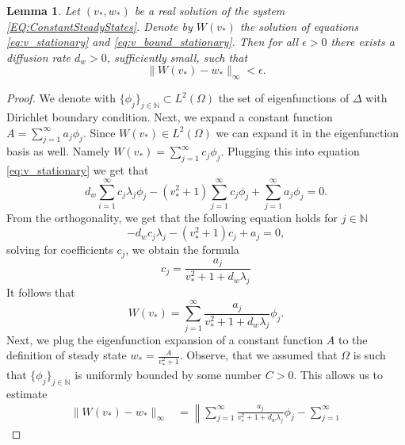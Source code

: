 \documentclass[11pt, a4paper]{article}
\theoremstyle{break}
\theoremstyle{break}
\theoremstyle{break}
\theoremstyle{break}
\theoremstyle{break}
\newtheorem{lem}{Lemma}[section]
\theoremstyle{break}
\theoremstyle{break}
\theoremstyle{break}
\theoremstyle{break}
\begin{document}
\begin{lem}
    \label{lem:stationary_v_estimate_v_star}
    Let $(v_*, w_*)$ be a real solution of the system \eqref{EQ:ConstantSteadyStates}. Denote by $W(v_*)$ the solution of equations \eqref{eq:v_stationary} and \eqref{eq:v_bound_stationary}. Then for all $\epsilon > 0$ there exists a diffusion rate $d_w > 0$, sufficiently small, such that
    \begin{equation*}
        \| W(v_*) - w_*\|_\infty < \epsilon.
    \end{equation*}
\end{lem}

\begin{proof}
    We denote with $\{\phi_j\}_{j \in \mathbb{N}} \subset L^2(\Omega)$ the set of  eigenfunctions of $\Delta$ with Dirichlet boundary condition. Next, 
    we expand a constant function $A = \sum_{j=1}^\infty a_j \phi_j$. Since $W(v_*) \in L^2(\Omega)$ we can expand it in the eigenfunction basis as well. Namely $W(v_*) = \sum_{j=1}^\infty c_j \phi_j$. Plugging this into equation \eqref{eq:v_stationary} we get that
    \begin{equation*}
        d_w\sum_{i=1}^\infty c_j \lambda_j \phi_j - (v_*^2 + 1) \sum_{j=1}^\infty c_j \phi_j + \sum_{j=1}^\infty a_j \phi_j = 0.
    \end{equation*}
    From the orthogonality, we get that the following equation holds for $j \in \mathbb{N}$
    \begin{equation*}
        -d_w c_j\lambda_j - (v_*^2+1) c_j + a_j = 0,
    \end{equation*}
    solving for coefficients $c_j$, we obtain the formula
    \begin{equation*}
        c_j = \frac{a_j}{v_*^2 + 1 + d_w\lambda_j}
    \end{equation*}
    It follows that
    \begin{equation*}
        W(v_*) = \sum_{j=1}^\infty \frac{a_j}{v_*^2 + 1 + d_w\lambda_j} \phi_j.
    \end{equation*}
    Next, we plug the eigenfunction expansion of a constant function $A$ to the definition of steady state $w_* = \frac{A}{v_*^2 + 1}$. Observe, that we assumed that $\Omega$ is such that $\{\phi_j\}_{j \in \mathbb{N}}$ is uniformly bounded by some number $C > 0$. This allows us to estimate
    \begin{align*}
    \|W(v_*) - w_*\|_\infty 
    &= 
    \left\|
        \sum_{j=1}^\infty 
        \frac{a_j}{v_*^2 + 1 + d_w \lambda_j} \phi_j 
        - 
        \sum_{j=1}^\infty 

\end{align*}
\end{proof}
\end{document}
